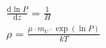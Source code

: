 \documentclass[11pt]{article}
\begin{document}
\begin{align*}
	&\frac{\mathrm{d}\ln P}{\mathrm{d}z} = \frac{1}{H}\\
	&\rho = \frac{\mu\cdot m_U\cdot\exp(\ln P)}{kT}
\end{align*}
\end{document}
